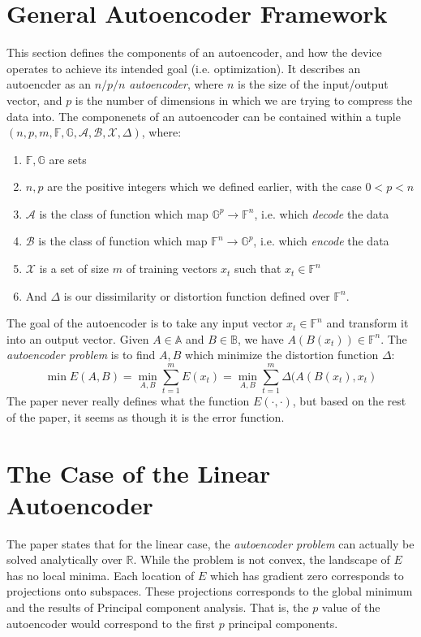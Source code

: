 \documentclass[20pt]{article} %
\begin{document}
\section{General Autoencoder Framework}
This section defines the components of an autoencoder, and how the device operates to achieve its intended goal (i.e. optimization).  It describes an autoencder as an $n/p/n$ \textit{autoencoder}, where $n$ is the size of the input/output vector, and $p$ is the number of dimensions in which we are trying to compress the data into.  The componenets of an autoencoder can be contained within a tuple $(n,p,m,\mathds{F},\mathds{G},\mathcal{A},\mathcal{B}, \mathcal{X}, \Delta)$, where:
\begin{enumerate}
\item $\mathds{F},\mathds{G}$ are sets
\item $n,p$ are the positive integers which we defined earlier, with the case $0 < p < n$
\item $\mathcal{A}$ is the class of function which map $\mathds{G}^{p} \rightarrow \mathds{F}^{n}$, i.e. which \textit{decode} the data
\item $\mathcal{B}$ is the class of function which map $\mathds{F}^{n} \rightarrow \mathds{G}^{p}$, i.e. which \textit{encode} the data
\item $\mathcal{X}$ is a set of size $m$ of training vectors $x_t$ such that $x_t \in \mathds{F}^{n}$
\item And $\Delta$ is our dissimilarity or distortion function defined over $\mathds{F}^{n}$.
\end{enumerate}
\newpage
The goal of the autoencoder is to take any input vector $x_t \in \mathds{F}^{n}$ and transform it into an output vector.  Given $A \in \mathds{A}$ and $B \in \mathds{B}$, we have $A(B(x_t)) \in \mathds{F}^{n}$. The \textit{autoencoder problem} is to find $A,B$ which minimize the distortion function $\Delta$:
$$ \min E(A,B) = \min_{A,B} \sum_{t=1}^{m}E(x_t) = \min_{A,B} \sum_{t=1}^{m}\Delta(A(B(x_t), x_t)$$
The paper never really defines what the function $E(\cdot, \cdot)$, but based on the rest of the paper, it seems as though it is the error function.

\section{The Case of the Linear Autoencoder}
The paper states that for the linear case, the \textit{autoencoder problem} can actually be solved analytically over $\mathds{R}$. While the problem is not convex, the landscape of $E$ has no local minima.  Each location of $E$ which has gradient zero corresponds to projections onto subspaces.  These projections corresponds to the global minimum and the results of Principal component analysis.  That is, the $p$ value of the autoencoder would correspond to the first $p$ principal components.
\end{document}
